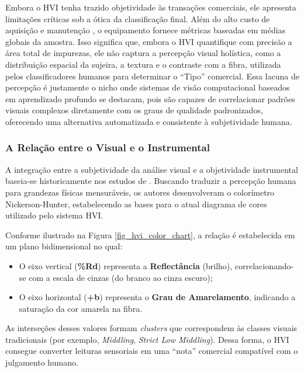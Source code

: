        Embora o HVI tenha trazido objetividade às transações comerciais, ele apresenta limitações críticas sob a ótica da classificação final. Além do alto custo de aquisição e manutenção \cite{cottonbrazil2021}, o equipamento fornece métricas baseadas em médias globais da amostra. Isso significa que, embora o HVI quantifique com precisão a área total de impurezas, ele não captura a percepção visual holística, como a distribuição espacial da sujeira, a textura e o contraste com a fibra, utilizada pelos classificadores humanos para determinar o ``Tipo'' comercial. Essa lacuna de percepção é justamente o nicho onde sistemas de visão computacional baseados em aprendizado profundo se destacam, pois são capazes de correlacionar padrões visuais complexos diretamente com os graus de qualidade padronizados, oferecendo uma alternativa automatizada e consistente à subjetividade humana.

    \subsubsection{A Relação entre o Visual e o Instrumental}

        A integração entre a subjetividade da análise visual e a objetividade instrumental baseia-se historicamente nos estudos de . Buscando traduzir a percepção humana para grandezas físicas mensuráveis, os autores desenvolveram o colorímetro Nickerson-Hunter, estabelecendo as bases para o atual diagrama de cores utilizado pelo sistema HVI.

        Conforme ilustrado na Figura \ref{fig_hvi_color_chart}, a relação é estabelecida em um plano bidimensional no qual:

        \begin{itemize}
            \item O eixo vertical (\textbf{\%Rd}) representa a \textbf{Reflectância} (brilho), correlacionando-se com a escala de cinzas (do branco ao cinza escuro);
            \item O eixo horizontal (\textbf{+b}) representa o \textbf{Grau de Amarelamento}, indicando a saturação da cor amarela na fibra.
        \end{itemize}

        As interseções desses valores formam \textit{clusters} que correspondem às classes visuais tradicionais (por exemplo, \textit{Middling}, \textit{Strict Low Middling}). Dessa forma, o HVI consegue converter leituras sensoriais em uma ``nota'' comercial compatível com o julgamento humano.

